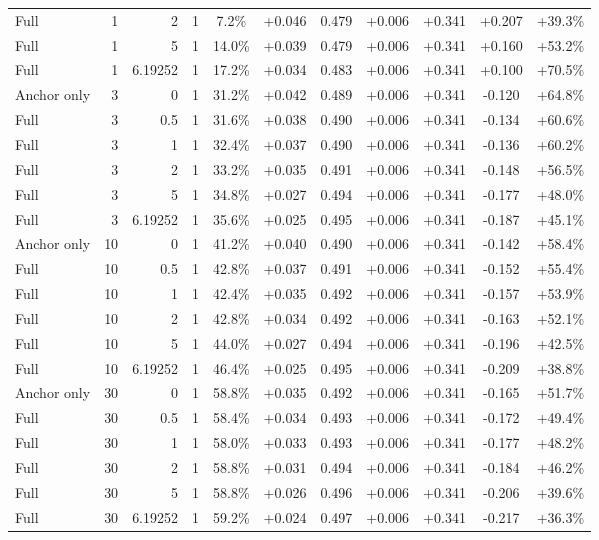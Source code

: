 \begin{table}[htbp]
\begin{tabular}{lrrrccccccc}
Full & 1 & 2 & 1 & 7.2\% & +0.046 & 0.479 & +0.006 & +0.341 & +0.207 & +39.3\% \\
Full & 1 & 5 & 1 & 14.0\% & +0.039 & 0.479 & +0.006 & +0.341 & +0.160 & +53.2\% \\
Full & 1 & 6.19252 & 1 & 17.2\% & +0.034 & 0.483 & +0.006 & +0.341 & +0.100 & +70.5\% \\
Anchor only & 3 & 0 & 1 & 31.2\% & +0.042 & 0.489 & +0.006 & +0.341 & -0.120 & +64.8\% \\
Full & 3 & 0.5 & 1 & 31.6\% & +0.038 & 0.490 & +0.006 & +0.341 & -0.134 & +60.6\% \\
Full & 3 & 1 & 1 & 32.4\% & +0.037 & 0.490 & +0.006 & +0.341 & -0.136 & +60.2\% \\
Full & 3 & 2 & 1 & 33.2\% & +0.035 & 0.491 & +0.006 & +0.341 & -0.148 & +56.5\% \\
Full & 3 & 5 & 1 & 34.8\% & +0.027 & 0.494 & +0.006 & +0.341 & -0.177 & +48.0\% \\
Full & 3 & 6.19252 & 1 & 35.6\% & +0.025 & 0.495 & +0.006 & +0.341 & -0.187 & +45.1\% \\
Anchor only & 10 & 0 & 1 & 41.2\% & +0.040 & 0.490 & +0.006 & +0.341 & -0.142 & +58.4\% \\
Full & 10 & 0.5 & 1 & 42.8\% & +0.037 & 0.491 & +0.006 & +0.341 & -0.152 & +55.4\% \\
Full & 10 & 1 & 1 & 42.4\% & +0.035 & 0.492 & +0.006 & +0.341 & -0.157 & +53.9\% \\
Full & 10 & 2 & 1 & 42.8\% & +0.034 & 0.492 & +0.006 & +0.341 & -0.163 & +52.1\% \\
Full & 10 & 5 & 1 & 44.0\% & +0.027 & 0.494 & +0.006 & +0.341 & -0.196 & +42.5\% \\
Full & 10 & 6.19252 & 1 & 46.4\% & +0.025 & 0.495 & +0.006 & +0.341 & -0.209 & +38.8\% \\
Anchor only & 30 & 0 & 1 & 58.8\% & +0.035 & 0.492 & +0.006 & +0.341 & -0.165 & +51.7\% \\
Full & 30 & 0.5 & 1 & 58.4\% & +0.034 & 0.493 & +0.006 & +0.341 & -0.172 & +49.4\% \\
Full & 30 & 1 & 1 & 58.0\% & +0.033 & 0.493 & +0.006 & +0.341 & -0.177 & +48.2\% \\
Full & 30 & 2 & 1 & 58.8\% & +0.031 & 0.494 & +0.006 & +0.341 & -0.184 & +46.2\% \\
Full & 30 & 5 & 1 & 58.8\% & +0.026 & 0.496 & +0.006 & +0.341 & -0.206 & +39.6\% \\
Full & 30 & 6.19252 & 1 & 59.2\% & +0.024 & 0.497 & +0.006 & +0.341 & -0.217 & +36.3\% \\

\end{tabular}
\end{table}
